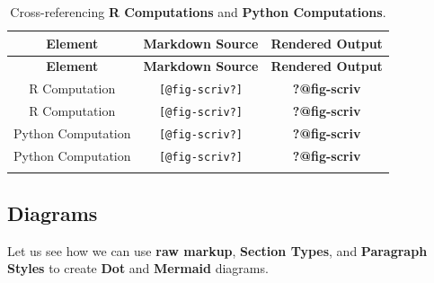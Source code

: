 \documentclass[
  12pt,
  a4paper,
  oneside,
  titlepage,
  toclink=all,
  toc=bibliography]{scrbook}
\theoremstyle{definition}
\theoremstyle{plain}
\theoremstyle{plain}
\theoremstyle{plain}
\theoremstyle{plain}
\theoremstyle{definition}
\theoremstyle{definition}
\theoremstyle{plain}
\theoremstyle{remark}
\begin{document}
\hypertarget{tbl-scriv14}{}
\begin{longtable}[]{@{}ccc@{}}
\toprule\noalign{}
\textbf{Element} & \textbf{Markdown Source} & \textbf{Rendered
Output} \\
\midrule\noalign{}
\endfirsthead
\toprule\noalign{}
\textbf{Element} & \textbf{Markdown Source} & \textbf{Rendered
Output} \\
\midrule\noalign{}
\endhead
\bottomrule\noalign{}
\endlastfoot
R Computation & \texttt{{[}@fig-scriv?{]}} &
\protect\hypertarget{cite_46}{}{\label{cite_46}\textbf{?@fig-scriv}} \\
R Computation & \texttt{{[}@fig-scriv?{]}} &
\protect\hypertarget{cite_47}{}{\label{cite_47}\textbf{?@fig-scriv}} \\
Python Computation & \texttt{{[}@fig-scriv?{]}} &
\protect\hypertarget{cite_48}{}{\label{cite_48}\textbf{?@fig-scriv}} \\
Python Computation & \texttt{{[}@fig-scriv?{]}} &
\protect\hypertarget{cite_49}{}{\label{cite_49}\textbf{?@fig-scriv}} \\
\caption{\label{tbl-scriv14}Cross-referencing \textbf{R Computations}
and \textbf{Python Computations}.}\tabularnewline
\end{longtable}

\hypertarget{sec-scriv15}{%
\subsection{Diagrams}\label{sec-scriv15}}

\protect\hypertarget{scriv15}{}{}

Let us see how we can use \textbf{raw markup}, \textbf{Section Types},
and \textbf{Paragraph Styles} to create \textbf{Dot} and
\textbf{Mermaid} diagrams.
\end{document}
